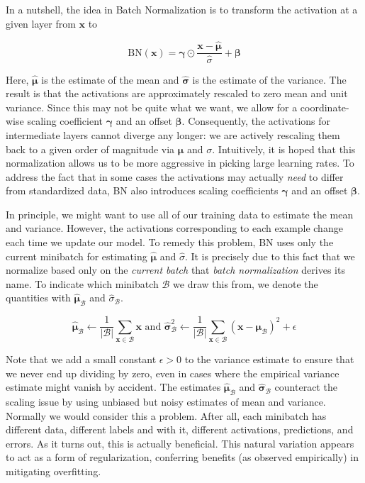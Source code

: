 In a nutshell, the idea in Batch Normalization is  to transform the activation at a given layer from $\mathbf{x}$ to

$$\mathrm{BN}(\mathbf{x}) = \mathbf{\gamma} \odot \frac{\mathbf{x} - \hat{\mathbf{\mu}}}{\hat\sigma} + \mathbf{\beta}$$

Here, $\hat{\mathbf{\mu}}$ is the estimate of the mean and $\hat{\mathbf{\sigma}}$ is the estimate of the variance. 
The result is that the activations are approximately rescaled to zero mean and unit variance. Since this may not be quite what we want, we allow for a coordinate-wise scaling coefficient $\mathbf{\gamma}$ and an offset $\mathbf{\beta}$. Consequently, the activations for intermediate layers cannot diverge any longer: we are actively rescaling them back to a given order of magnitude via $\mathbf{\mu}$ and $\sigma$. Intuitively, it is hoped that this normalization allows us to be more aggressive in picking large learning rates. To address the fact that in some cases the activations may actually \textit{need} to differ from standardized data, BN also introduces scaling coefficients $\mathbf{\gamma}$ and an offset $\mathbf{\beta}$.

In principle, we might want to use all of our training data to estimate the mean and variance. However, the activations corresponding to each example change each time we update our model. To remedy this problem, BN uses only the current minibatch for estimating $\hat{\mathbf{\mu}}$ and $\hat\sigma$. It is precisely due to this fact that we normalize based only on the \textit{current batch}
that \textit{batch normalization} derives its name. To indicate which minibatch $\mathcal{B}$ we draw this from, we denote the quantities with $\hat{\mathbf{\mu}}_\mathcal{B}$ and $\hat\sigma_\mathcal{B}$.

$$\hat{\mathbf{\mu}}_\mathcal{B} \leftarrow \frac{1}{|\mathcal{B}|} \sum_{\mathbf{x} \in \mathcal{B}} \mathbf{x}
\text{ and }
\hat{\mathbf{\sigma}}_\mathcal{B}^2 \leftarrow \frac{1}{|\mathcal{B}|} \sum_{\mathbf{x} \in \mathcal{B}} (\mathbf{x} - \mathbf{\mu}_{\mathcal{B}})^2 + \epsilon$$

Note that we add a small constant $\epsilon > 0$ to the variance estimate to ensure that we never end up dividing by zero, 
even in cases where the empirical variance estimate might vanish by accident. The estimates $\hat{\mathbf{\mu}}_\mathcal{B}$ 
and $\hat{\mathbf{\sigma}}_\mathcal{B}$ counteract the scaling issue by using unbiased but noisy estimates of mean and variance. 
Normally we would consider this a problem. After all, each minibatch has different data, different labels and with it, different activations, predictions, and errors. As it turns out, this is actually beneficial. This natural variation appears to act as a form of regularization, conferring benefits (as observed empirically) in mitigating overfitting. 

